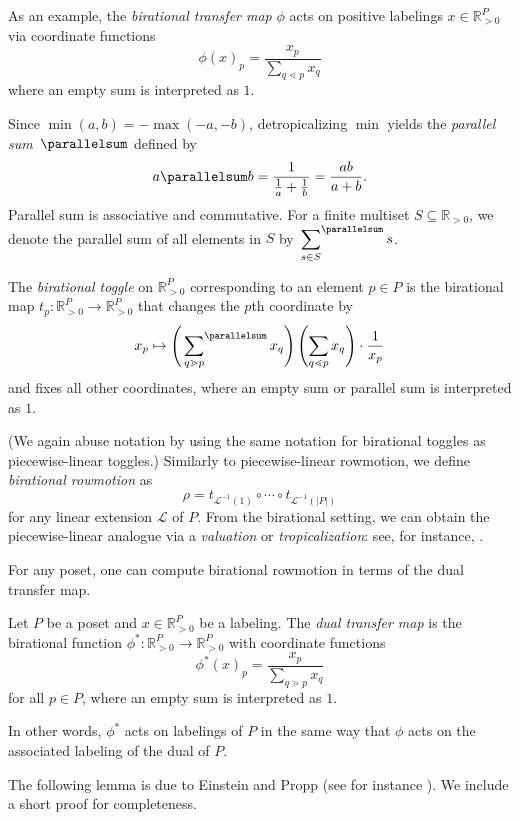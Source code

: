 As an example, the \emph{birational transfer map} $\phi$ acts on positive labelings $x \in \mathbb R^P_{>0}$ via coordinate functions
\[\phi(x)_p = \frac{x_p}{\sum\limits_{q \lessdot p} x_q}\]
where an empty sum is interpreted as $1$.

Since $\min(a,b) = -\max(-a,-b)$, detropicalizing $\min$ yields the \textit{parallel sum}~$\parallelsum$ defined by
\[a \parallelsum b = \frac{1}{\frac{1}{a} + \frac{1}{b}} = \frac{ab}{a+b}.\]
Parallel sum is associative and commutative. For a finite multiset $S \subseteq \mathbb{R}_{>0}$, we denote the parallel sum of all elements in $S$ by $\sideset{}{^{\parallelsum}} \sum\limits_{s \in S} s$.


\begin{Def}
The \textit{birational toggle} on $\mathbb{R}^{P}_{>0}$ corresponding to an element $p \in P$ is the birational map $t_p\colon \mathbb{R}^{P}_{>0} \to \mathbb{R}^{P}_{>0}$ that changes the $p$th coordinate by
\[x_p \mapsto \left( \sideset{}{^{\parallelsum}} \sum\limits_{q \gtrdot p} x_q \right) \left( \sum\limits_{q \lessdot p} x_q \right) \cdot \frac{1}{x_p}\]
and fixes all other coordinates, where an empty sum or parallel sum is interpreted as $1$.
\end{Def}
(We again abuse notation by using the same notation for birational toggles as piecewise-linear toggles.) Similarly to piecewise-linear rowmotion, we define \textit{birational rowmotion} as
\[\rho = t_{\mathcal{L}^{-1}(1)} \circ \cdots \circ t_{\mathcal{L}^{-1}(|P|)}\]
for any linear extension $\mathcal{L}$ of $P$. From the birational setting, we can obtain the piecewise-linear analogue via a \textit{valuation} or \emph{tropicalization}: see, for instance, \cite{einsteinpropp2,einsteinpropp1}. 

For any poset, one can compute birational rowmotion in terms of the dual transfer map.

\begin{Def}
Let $P$ be a poset and $x \in \mathbb{R}_{>0}^{P}$ be a labeling. The \emph{dual transfer map} is the birational function $\phi^*\colon\mathbb{R}_{>0}^{P} \to \mathbb{R}_{>0}^{P}$ with coordinate functions
\[\phi^*(x)_p = \frac{x_p}{\sum\limits_{q \gtrdot p} x_q}\]
for all $p \in P$, where an empty sum is interpreted as $1$.
\end{Def}

In other words, $\phi^*$ acts on labelings of $P$ in the same way that $\phi$ acts on the associated labeling of the dual of $P$. 

The following lemma is due to Einstein and Propp (see for instance \cite{einsteinpropp2,josephroby2}). We include a short proof for completeness.

